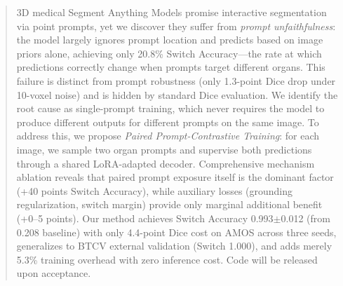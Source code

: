 \begin{abstract}
3D medical Segment Anything Models promise interactive segmentation via point prompts, yet we discover they suffer from \emph{prompt unfaithfulness}: the model largely ignores prompt location and predicts based on image priors alone, achieving only 20.8\% Switch Accuracy---the rate at which predictions correctly change when prompts target different organs. This failure is distinct from prompt robustness (only 1.3-point Dice drop under 10-voxel noise) and is hidden by standard Dice evaluation. We identify the root cause as single-prompt training, which never requires the model to produce different outputs for different prompts on the same image. To address this, we propose \emph{Paired Prompt-Contrastive Training}: for each image, we sample two organ prompts and supervise both predictions through a shared LoRA-adapted decoder. Comprehensive mechanism ablation reveals that paired prompt exposure itself is the dominant factor (+40 points Switch Accuracy), while auxiliary losses (grounding regularization, switch margin) provide only marginal additional benefit (+0--5 points). Our method achieves Switch Accuracy 0.993$\pm$0.012 (from 0.208 baseline) with only 4.4-point Dice cost on AMOS across three seeds, generalizes to BTCV external validation (Switch 1.000), and adds merely 5.3\% training overhead with zero inference cost. Code will be released upon acceptance.
\end{abstract}

